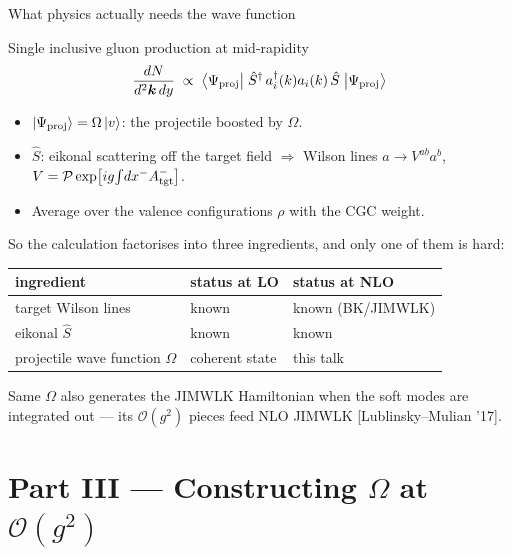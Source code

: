 \documentclass[9pt,aspectratio=169]{beamer}
\newcommand{\hl}[1]{\textcolor{acc}{#1}}
\newcommand{\hb}[1]{\textcolor{blu}{#1}}
\newcommand{\xm}{x^{-}}
\newcommand{\Om}{\Omega}
\newcommand{\ket}[1]{\left|#1\right\rangle}
\newcommand{\ad}{a^{\dagger}}
\begin{document}
\begin{frame}{What physics actually needs the wave function}
\begin{block}{Single inclusive gluon production at mid-rapidity}
\[
\frac{dN}{d^{2}\bm k\,dy}\;\propto\;
\big\langle \Psi_{\rm proj}\big|\;\hat{S}^{\dagger}\,\ad_{i}(k)a_{i}(k)\,\hat S\;\big|\Psi_{\rm proj}\big\rangle
\]
\begin{itemize}
  \item $\ket{\Psi_{\rm proj}}=\Om\ket{v}$: the projectile \hl{boosted} by $\Om$.
  \item $\hat S$: eikonal scattering off the target field $\Rightarrow$ \hb{Wilson lines}
        $a\to V^{ab}a^{b}$, $V=\mathcal{P}\exp\!\big[ig\!\int\! d\xm A^{-}_{\rm tgt}\big]$.
  \item Average over the valence configurations $\rho$ with the CGC weight.
\end{itemize}
\end{block}
\vspace{-2pt}
So the calculation factorises into three ingredients, and \hl{only one of them is hard}:
\begin{center}
\scriptsize
\begin{tabular}{lll}
\toprule
ingredient & status at LO & status at NLO\\
\midrule
target Wilson lines & known & known (BK/JIMWLK)\\
eikonal $\hat S$ & known & known\\
\hl{projectile wave function $\Om$} & coherent state & \hl{this talk}\\
\bottomrule
\end{tabular}
\end{center}
\vspace{-2pt}
{\small Same $\Om$ also generates the \hl{JIMWLK} Hamiltonian when the soft modes are
integrated out --- its $\mathcal{O}(g^{2})$ pieces feed NLO JIMWLK [Lublinsky--Mulian '17].}
\end{frame}

\section{Part III --- Constructing $\Omega$ at $\mathcal{O}(g^2)$}
\end{document}
